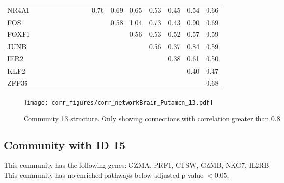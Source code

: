 \begin{longtable}{lrrrrrrrrrrrrrrr}
NR4A1  &             &            &             &              &             &            &             &             &      0.76 &        0.69 &       0.65 &       0.53 &       0.45 &        0.54 &          0.66 \\
FOS    &             &            &             &              &             &            &             &             &           &        0.58 &       1.04 &       0.73 &       0.43 &        0.90 &          0.69 \\
FOXF1  &             &            &             &              &             &            &             &             &           &             &       0.56 &       0.53 &       0.52 &        0.57 &          0.59 \\
JUNB   &             &            &             &              &             &            &             &             &           &             &            &       0.56 &       0.37 &        0.84 &          0.59 \\
IER2   &             &            &             &              &             &            &             &             &           &             &            &            &       0.38 &        0.61 &          0.50 \\
KLF2   &             &            &             &              &             &            &             &             &           &             &            &            &            &        0.40 &          0.47 \\
ZFP36  &             &            &             &              &             &            &             &             &           &             &            &            &            &             &          0.68 \\
\end{longtable}


\begin{figure}[h!]
\centering
\texttt{[image: corr\_figures/corr\_networkBrain\_Putamen\_13.pdf]}
\caption{Community 13 structure. Only showing connections with correlation greater than 0.8}
\end{figure}




\subsection*{Community with ID 15}
This community has the following genes: GZMA, PRF1, CTSW, GZMB, NKG7, IL2RB
\\
This community has no enriched pathways below adjusted p-value $< 0.05$.

